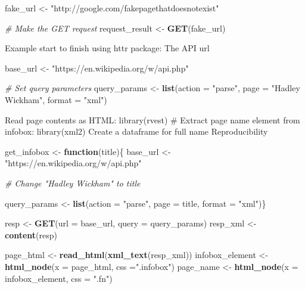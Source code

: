 \documentclass[]{book}
\newenvironment{Shaded}{\begin{snugshade}}{\end{snugshade}}
\newcommand{\CommentTok}[1]{\textcolor[rgb]{0.56,0.35,0.01}{\textit{#1}}}
\newcommand{\ControlFlowTok}[1]{\textcolor[rgb]{0.13,0.29,0.53}{\textbf{#1}}}
\newcommand{\DataTypeTok}[1]{\textcolor[rgb]{0.13,0.29,0.53}{#1}}
\newcommand{\KeywordTok}[1]{\textcolor[rgb]{0.13,0.29,0.53}{\textbf{#1}}}
\newcommand{\NormalTok}[1]{#1}
\newcommand{\StringTok}[1]{\textcolor[rgb]{0.31,0.60,0.02}{#1}}
\begin{document}
\begin{Shaded}
\begin{Highlighting}[]
\NormalTok{fake_url <-}\StringTok{ "http://google.com/fakepagethatdoesnotexist"}

\CommentTok{# Make the GET request}
\NormalTok{request_result <-}\StringTok{ }\KeywordTok{GET}\NormalTok{(fake_url)}
\end{Highlighting}
\end{Shaded}

Example start to finish using httr package: The API url

\begin{Shaded}
\begin{Highlighting}[]
\NormalTok{base_url <-}\StringTok{ "https://en.wikipedia.org/w/api.php"}

\CommentTok{# Set query parameters}
\NormalTok{query_params <-}\StringTok{ }\KeywordTok{list}\NormalTok{(}\DataTypeTok{action =} \StringTok{"parse"}\NormalTok{, }
                     \DataTypeTok{page =} \StringTok{"Hadley Wickham"}\NormalTok{, }
                     \DataTypeTok{format =} \StringTok{"xml"}\NormalTok{)}
\end{Highlighting}
\end{Shaded}

Read page contents as HTML: library(rvest)
\# Extract page name element from infobox: library(xml2)
Create a dataframe for full name
Reproducibility

\begin{Shaded}
\begin{Highlighting}[]
\NormalTok{get_infobox <-}\StringTok{ }\ControlFlowTok{function}\NormalTok{(title)\{}
\NormalTok{  base_url <-}\StringTok{ "https://en.wikipedia.org/w/api.php"}
  
\CommentTok{# Change "Hadley Wickham" to title}

\NormalTok{query_params <-}\StringTok{ }\KeywordTok{list}\NormalTok{(}\DataTypeTok{action =} \StringTok{"parse"}\NormalTok{, }
                       \DataTypeTok{page =}\NormalTok{ title, }
                       \DataTypeTok{format =} \StringTok{"xml"}\NormalTok{)\}}
  
\NormalTok{resp <-}\StringTok{ }\KeywordTok{GET}\NormalTok{(}\DataTypeTok{url =}\NormalTok{ base_url, }\DataTypeTok{query =}\NormalTok{ query_params)}
\NormalTok{resp_xml <-}\StringTok{ }\KeywordTok{content}\NormalTok{(resp)}
  
\NormalTok{page_html <-}\StringTok{ }\KeywordTok{read_html}\NormalTok{(}\KeywordTok{xml_text}\NormalTok{(resp_xml))}
\NormalTok{infobox_element <-}\StringTok{ }\KeywordTok{html_node}\NormalTok{(}\DataTypeTok{x =}\NormalTok{ page_html, }\DataTypeTok{css =}\StringTok{".infobox"}\NormalTok{)}
\NormalTok{page_name <-}\StringTok{ }\KeywordTok{html_node}\NormalTok{(}\DataTypeTok{x =}\NormalTok{ infobox_element, }\DataTypeTok{css =} \StringTok{".fn"}\NormalTok{)}
\end{Highlighting}
\end{Shaded}
\end{document}

